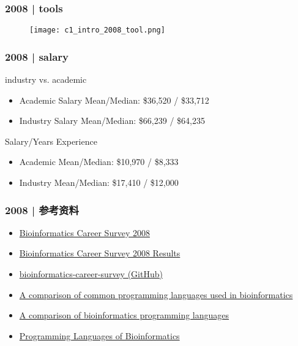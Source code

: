 \begin{frame}
  \frametitle{2008 | tools}
   \begin{figure}
     \centering
     \texttt{[image: c1\_intro\_2008\_tool.png]}
   \end{figure}
\end{frame}

\begin{frame}
  \frametitle{2008 | salary}
  \begin{block}{industry vs. academic}
    \begin{itemize}
      \item Academic Salary Mean/Median: \$36,520 / \$33,712
      \item Industry Salary Mean/Median: \$66,239 / \$64,235
    \end{itemize}
  \end{block}
  \pause
  \begin{block}{Salary/Years Experience}
    \begin{itemize}
      \item Academic Mean/Median: \$10,970 / \$8,333
      \item Industry Mean/Median: \$17,410 / \$12,000
    \end{itemize}
  \end{block}
\end{frame}

\begin{frame}
  \frametitle{2008 | 参考资料}
  \begin{itemize}
    \item \href{http://openwetware.org/wiki/Biogang:Projects/Nioinformatics\_Career\_Survey\_2008}{Bioinformatics Career Survey 2008}
    \item \href{http://openwetware.org/wiki/Biogang:Projects/Bioinformatics\_Career\_Survey\_2008\_Results}{Bioinformatics Career Survey 2008 Results}
    \item \href{https://github.com/michaelbarton/bioinformatics-career-survey}{bioinformatics-career-survey (GitHub)}
    \item \href{http://www.ncbi.nlm.nih.gov/pmc/articles/PMC2267699/}{A comparison of common programming languages used in bioinformatics}
    \item \href{http://www.molecularecologist.com/2012/11/a-comparison-of-bioinformatics-programming-languages/}{A comparison of bioinformatics programming languages}
    \item \href{https://nlcb.wordpress.com/2013/02/23/programming-languages-of-bioinformatics-2/}{Programming Languages of Bioinformatics}
  \end{itemize}
\end{frame}

